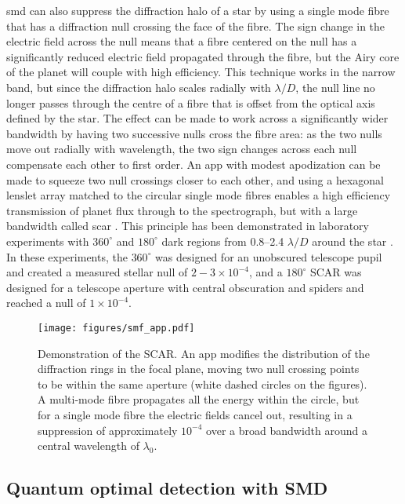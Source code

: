 \documentclass[letterpaper]{ar-1col}
\newcommand{\ld}{$\lambda/D$}
\begin{document}
\ac{smd} can also suppress the diffraction halo of a star by using a single mode fibre that has a diffraction null crossing the face of the fibre.
%
The sign change in the electric field across the null means that a fibre centered on the null has a significantly reduced electric field propagated through the fibre, but the Airy core of the planet will couple with high efficiency.
%
This technique works in the narrow band, but since the diffraction halo scales radially with \ld{}, the null line no longer passes through the centre of a fibre that is offset from the optical axis defined by the star.
%
The effect can be made to work across a significantly wider bandwidth by having two successive nulls cross the fibre area: as the two nulls move out radially with wavelength, the two sign changes across each null compensate each other to first order.
%
An \ac{app} with modest apodization can be made to squeeze two null crossings closer to each other, and using a hexagonal lenslet array matched to the circular single mode fibres enables a high efficiency transmission of planet flux \citep{haffert2021fundamental} through to the spectrograph, but with a large bandwidth called \acl{scar} \citep[\acs{scar}; ][]{Por20a,Haffert20}.
%
This principle has been demonstrated in laboratory experiments with $360^\circ$ and $180^\circ$ dark regions from 0.8–2.4 \ld{} around the star \citep{Haffert20}.
%
In these experiments, the $360^\circ$ was designed for an unobscured telescope pupil and created a measured stellar null of $2-3 \times 10^{-4}$, and a $180^\circ$ SCAR was designed for a telescope aperture with central obscuration and spiders and reached a null of $1\times 10^{-4}$. 

\begin{figure}[ht]
  \centering
  \texttt{[image: figures/smf\_app.pdf]}
  \caption{Demonstration of the SCAR.
  An \ac{app} modifies the distribution of the diffraction rings in the focal plane, moving two null crossing points to be within the same aperture (white dashed circles on the figures).
  A multi-mode fibre propagates all the energy within the circle, but for a single mode fibre the electric fields cancel out, resulting in a suppression of approximately $10^{-4}$ over a broad bandwidth around a central wavelength of $\lambda_0$.}
  \label{fig:scar}
\end{figure}

\subsection{Quantum optimal detection with SMD}
\end{document}
